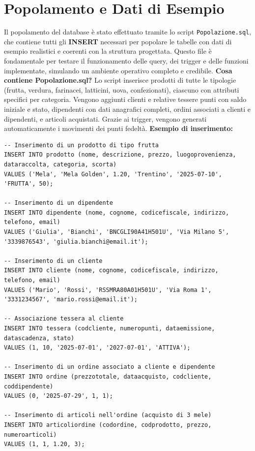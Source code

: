 \documentclass[a4paper,12pt]{article}
\begin{document}
\newpage
\section{Popolamento e Dati di Esempio}

Il popolamento del database è stato effettuato tramite lo script \texttt{Popolazione.sql}, che contiene tutti gli \textbf{INSERT} necessari per popolare le tabelle con dati di esempio realistici e coerenti con la struttura progettata. Questo file è fondamentale per testare il funzionamento delle query, dei trigger e delle funzioni implementate, simulando un ambiente operativo completo e credibile.
\vspace{0.5em}
\textbf{Cosa contiene Popolazione.sql?}
\newline
Lo script inserisce prodotti di tutte le tipologie (frutta, verdura, farinacei, latticini, uova, confezionati), ciascuno con attributi specifici per categoria. Vengono aggiunti clienti e relative tessere punti con saldo iniziale e stato, dipendenti con dati anagrafici completi, ordini associati a clienti e dipendenti, e articoli acquistati. Grazie ai trigger, vengono generati automaticamente i movimenti dei punti fedeltà.
\vspace{0.5em}
\textbf{Esempio di inserimento:}
\begin{lstlisting}[style=sqlstyle]
-- Inserimento di un prodotto di tipo frutta
INSERT INTO prodotto (nome, descrizione, prezzo, luogoprovenienza, dataraccolta, categoria, scorta)
VALUES ('Mela', 'Mela Golden', 1.20, 'Trentino', '2025-07-10', 'FRUTTA', 50);

-- Inserimento di un dipendente
INSERT INTO dipendente (nome, cognome, codicefiscale, indirizzo, telefono, email)
VALUES ('Giulia', 'Bianchi', 'BNCGLI90A41H501U', 'Via Milano 5', '3339876543', 'giulia.bianchi@email.it');

-- Inserimento di un cliente
INSERT INTO cliente (nome, cognome, codicefiscale, indirizzo, telefono, email)
VALUES ('Mario', 'Rossi', 'RSSMRA80A01H501U', 'Via Roma 1', '3331234567', 'mario.rossi@email.it');

-- Associazione tessera al cliente
INSERT INTO tessera (codcliente, numeropunti, dataemissione, datascadenza, stato)
VALUES (1, 10, '2025-07-01', '2027-07-01', 'ATTIVA');

-- Inserimento di un ordine associato a cliente e dipendente
INSERT INTO ordine (prezzototale, dataacquisto, codcliente, coddipendente)
VALUES (0, '2025-07-29', 1, 1);

-- Inserimento di articoli nell'ordine (acquisto di 3 mele)
INSERT INTO articoliordine (codordine, codprodotto, prezzo, numeroarticoli)
VALUES (1, 1, 1.20, 3);
\end{lstlisting}
\end{document}
